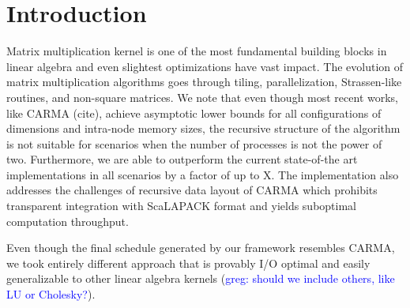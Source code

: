 \documentclass[sigconf]{acmart}
\newcommand\greg[1]{\textcolor{blue}{greg: #1}}
\begin{document}
	
	\section{Introduction}
	Matrix multiplication kernel is one of the most fundamental building blocks 
	in linear algebra and even slightest optimizations have vast impact. The 
	evolution of matrix multiplication algorithms goes through tiling, 
	parallelization, Strassen-like routines, and non-square matrices. We note 
	that even though most recent works, like CARMA (cite), achieve asymptotic 
	lower bounds for all configurations of dimensions and intra-node memory 
	sizes, the recursive structure of the algorithm is not suitable for 
	scenarios when the number of processes is not the power of two. 
	Furthermore, we are able to outperform the current state-of-the art 
	implementations in all scenarios by a factor of up to X. The implementation 
	also addresses the challenges of recursive data layout of CARMA which 
	prohibits transparent integration with ScaLAPACK format and yields 
	suboptimal computation throughput.
	
	Even though the final schedule generated by our framework resembles CARMA, 
	we took entirely different approach that is provably I/O optimal and easily 
	generalizable to other linear algebra kernels (\greg{should we include 
	others, like LU or Cholesky?}).
	
\end{document}
